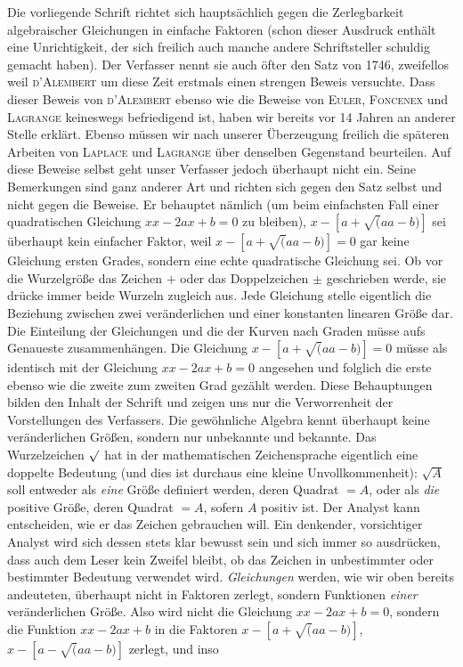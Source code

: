 Die vorliegende Schrift richtet sich hauptsächlich gegen die Zerlegbarkeit algebraischer Gleichungen in einfache Faktoren (schon dieser Ausdruck enthält eine Unrichtigkeit, der sich freilich auch manche andere Schriftsteller
schuldig gemacht haben). Der Verfasser nennt sie auch öfter den Satz von 1746, zweifellos weil \textsc{d’Alembert} um diese Zeit erstmals einen strengen Beweis versuchte. Dass dieser Beweis von \textsc{d’Alembert} ebenso wie die Beweise von \textsc{Euler}, \textsc{Foncenex} und \textsc{Lagrange} keineswegs befriedigend ist, haben wir bereits vor 14 Jahren an anderer Stelle erklärt. Ebenso müssen wir nach unserer Überzeugung freilich die späteren Arbeiten von \textsc{Laplace} und \textsc{Lagrange} über denselben Gegenstand beurteilen. Auf diese Beweise selbst geht unser Verfasser jedoch überhaupt nicht ein. Seine Bemerkungen sind ganz anderer Art und richten sich gegen den Satz selbst und nicht gegen die Beweise. Er behauptet nämlich (um beim einfachsten Fall einer quadratischen Gleichung $xx-2ax+b=0$ zu bleiben), $x-[a+\surd(aa-b)]$ sei überhaupt kein einfacher Faktor, weil $x-[a+\surd(aa-b)]=0$ gar keine Gleichung ersten Grades, sondern eine echte quadratische Gleichung sei. Ob vor die Wurzelgröße das Zeichen $+$ oder das Doppelzeichen $\pm$ geschrieben werde, sie drücke immer beide Wurzeln zugleich aus. Jede Gleichung stelle eigentlich die Beziehung zwischen zwei veränderlichen und einer konstanten linearen Größe dar. Die Einteilung der Gleichungen und die der Kurven nach Graden müsse aufs Genaueste zusammenhängen. Die Gleichung $x-[a+\surd(aa-b)]=0$ müsse als identisch mit der Gleichung $xx-2ax+b=0$ angesehen und folglich die erste ebenso wie die zweite zum zweiten Grad gezählt werden. Diese Behauptungen bilden den Inhalt der Schrift und zeigen uns nur die Verworrenheit der Vorstellungen des Verfassers. Die gewöhnliche Algebra kennt überhaupt keine veränderlichen Größen, sondern nur unbekannte und bekannte. Das Wurzelzeichen $\surd$ hat in der mathematischen Zeichensprache eigentlich eine doppelte Bedeutung (und dies ist durchaus eine kleine Unvollkommenheit): $\surd A$ soll entweder als \textit{eine} Größe definiert werden, deren Quadrat $=A$, oder als \textit{die} positive Größe, deren Quadrat $=A$, sofern $A$ positiv ist. Der Analyst kann entscheiden, wie er das Zeichen gebrauchen will. Ein denkender, vorsichtiger Analyst wird sich dessen stets klar bewusst sein und sich immer so ausdrücken, dass auch dem Leser kein Zweifel bleibt, ob das Zeichen in unbestimmter oder bestimmter Bedeutung verwendet wird. \textit{Gleichungen} werden, wie wir oben bereits andeuteten, überhaupt nicht in Faktoren zerlegt, sondern Funktionen \textit{einer} veränderlichen Größe. Also wird nicht die Gleichung $xx-2ax+b=0$, sondern die Funktion $xx-2ax+b$ in die Faktoren $x-[a+\surd(aa-b)]$, $x-[a-\surd(aa-b)]$ zerlegt, und inso%
